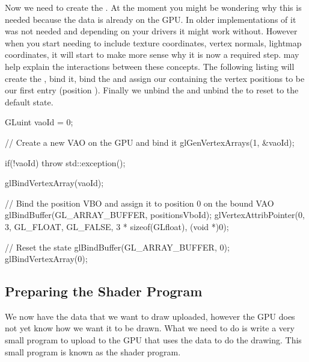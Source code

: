 \documentclass[10pt]{article}
\begin{document}
Now we need to create the . At the
moment you might be wondering why this is needed because the data is
already on the GPU.  In older implementations of  it was
not needed and depending on your drivers it might work without. However
when you start needing to include texture coordinates, vertex normals,
lightmap coordinates, it will start to make more sense why it is now
a required step.  may help explain the interactions between
these concepts. The following listing will create the , bind
it, bind the  and assign our  containing the vertex
positions to be our first entry (position ). Finally we unbind
the  and unbind the  to reset to the default state.

\begin{Listing}

  GLuint vaoId = 0;

  // Create a new VAO on the GPU and bind it
  glGenVertexArrays(1, &vaoId);

  if(!vaoId)
  {
    throw std::exception();
  }

  glBindVertexArray(vaoId);

  // Bind the position VBO and assign it to position 0 on the bound VAO
  glBindBuffer(GL_ARRAY_BUFFER, positionsVboId);
  glVertexAttribPointer(0, 3, GL_FLOAT, GL_FALSE, 3 * sizeof(GLfloat), (void *)0);

  // Reset the state
  glBindBuffer(GL_ARRAY_BUFFER, 0);
  glBindVertexArray(0);

\end{Listing}


\subsection*{Preparing the Shader Program}
We now have the data that we want to draw uploaded, however the GPU does
not yet know how we want it to be drawn. What we need to do is write
a very small program to upload to the GPU that uses the data to do the
drawing. This small program is known as the shader program.

\end{document}
